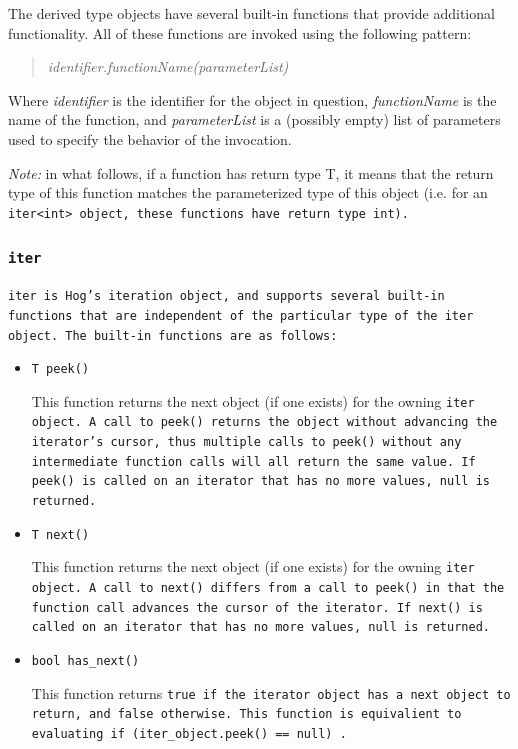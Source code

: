 \documentclass{article}
\begin{document}
The derived type objects have several built-in functions that provide additional functionality. All of these functions
are invoked using the following pattern:

\begin{quotation}
\emph{identifier.functionName(parameterList)}
\end{quotation}

\noindent Where \emph{identifier} is the identifier for the object in question, \emph{functionName} is the name of the
function, and \emph{parameterList} is a (possibly empty) list of parameters used to specify the behavior of the invocation.

\emph{Note:} in what follows, if a function has return type T, it means that the return type of this function matches the
parameterized type of this object (i.e. for an \tt iter<int> \rm object, these functions have return type \tt int\rm).

\subsubsection{\tt iter \rm} %
\label{ssub:iter}

\tt iter \rm is Hog's iteration object, and supports several built-in functions
that are independent of the particular type of the \tt iter \rm object. The built-in functions are as follows:

\begin{itemize}

\item[] \tt T peek() \rm

This function returns the next object (if one exists) for the owning \tt iter \rm
object. A call to \tt peek() \rm returns the object without advancing the iterator's
cursor, thus multiple calls to \tt peek() \rm without any intermediate function calls
will all return the same value. If \tt peek() \rm is called on an iterator that has
no more values, \tt null \rm is returned. 

\item[] \tt T next() \rm

This function returns the next object (if one exists) for the owning \tt iter \rm
object. A call to \tt next() \rm differs from a call to \tt peek() \rm in that the
function call advances the cursor of the iterator. If \tt next() \rm is called on
an iterator that has no more values, \tt null \rm is returned. 

\item[] \tt bool has\_next() \rm

This function returns \tt true \rm if the iterator object has a next object
to return, and \tt false \rm otherwise. This function is equivalient to evaluating
\tt if (iter\_object.peek() == null) \rm.

\end{itemize} 
\end{document}
